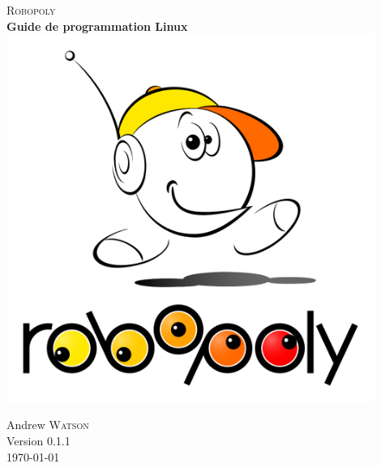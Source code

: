 \documentclass[a4paper]{article}
\begin{document}
\begin{titlepage}
\nocite{*}      %
  \begin{center}
     
     
     
    \vfill 
    \textsc{\LARGE Robopoly }\\[1.0cm]

    { \huge \bfseries Guide de programmation Linux}\\[0.4cm]
    \includegraphics[width=12cm]{images/robo_bobo_blanc_big}\\[0.5cm]

    \vfill

     
    Andrew \textsc{Watson}\\[0.5cm] 
    Version 0.1.1\\[0.5cm]
    {\large \today} 
     
  \end{center}

\end{titlepage}

\newpage{}

\fancyfoot{}
\lhead{}
\cfoot{\thepage}        %
\rfoot{\today} %
\end{document}
